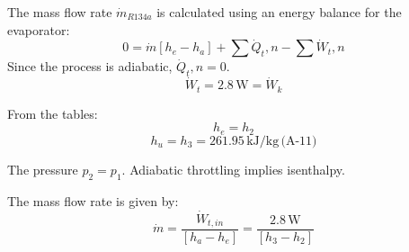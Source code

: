 The mass flow rate \( \dot{m}_{R134a} \) is calculated using an energy balance for the evaporator:  
\[ 0 = \dot{m} [h_e - h_a] + \sum \dot{Q}_t,n - \sum \dot{W}_t,n \]  
Since the process is adiabatic, \( \dot{Q}_t,n = 0 \).  
\[ \dot{W}_t = 2.8 \, \text{W} = \dot{W}_k \]  

From the tables:  
\[ h_e = h_2 \]  
\[ h_u = h_3 = 261.95 \, \text{kJ/kg} \, \text{(A-11)} \]  

The pressure \( p_2 = p_1 \).  
Adiabatic throttling implies isenthalpy.  

The mass flow rate is given by:  
\[ \dot{m} = \frac{\dot{W}_{t,in}}{[h_a - h_e]} = \frac{2.8 \, \text{W}}{[h_3 - h_2]} \]